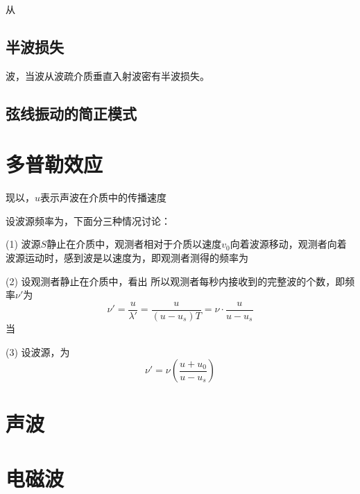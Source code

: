     从

    \subsection{半波损失}
    波，当波从波疏介质垂直入射波密有半波损失。
    \subsection{弦线振动的简正模式}

\section{多普勒效应}
    现以，$u$表示声波在介质中的传播速度

    设波源频率为，下面分三种情况讨论：

    (1) 波源$S$静止在介质中，观测者相对于介质以速度$v_0$向着波源移动，观测者向着波源运动时，感到波是以速度为，即观测者测得的频率为

    (2) 设观测者静止在介质中，看出
    所以观测者每秒内接收到的完整波的个数，即频率$\nu'$为
    \[
    \nu'=\frac{u}{\lambda'}=\frac{u}{(u-u_s)T}=\nu\cdot\frac{u}{u-u_s}
    \]
    当

    (3) 设波源，为
    \[
    \nu'=\nu\left(\frac{u+u_0}{u-u_s}\right)
    \]

\section{声波}

\section{电磁波}

\endinput